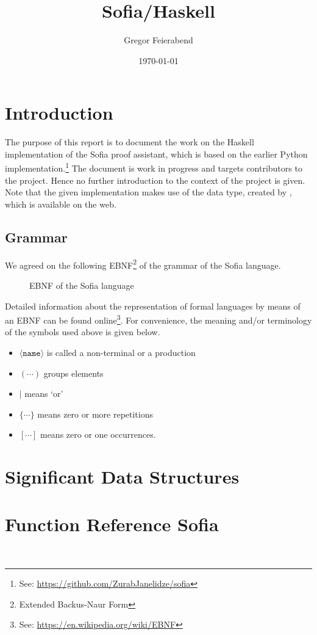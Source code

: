 \documentclass[notitlepage]{report}
\title{Sofia/Haskell}
\author{Gregor Feierabend}
\date{\today}
\begin{document}

\maketitle

\begingroup
\let\clearpage\relax
\tableofcontents
\endgroup


\chapter{Introduction}
The purpose of this report is to document the work on the Haskell
implementation of the Sofia proof assistant, which is based on the earlier
Python implementation.\footnote{See: %
\url{https://github.com/ZurabJanelidze/sofia}}
The document is work in progress and targets contributors to the project. Hence
no further introduction to the context of the project is given. Note that the
given implementation makes use of the  data type, created by
\textcite{Hutton}, which is available on the web.
\section{Grammar}
We agreed on the following EBNF\footnote{Extended Backus-Naur Form} of the
grammar of the Sofia language.
\begin{figure}[h!]
    {\renewcommand{\arraystretch}{2.0}
    }
    \caption{EBNF of the Sofia language}
\end{figure}

Detailed information about the representation of formal languages by means of an
EBNF can be found online\footnote{%
See: \url{https://en.wikipedia.org/wiki/EBNF}}. For convenience,
the meaning and/or terminology of the symbols used above is given below.
\begin{multicols}{2}
\begin{itemize}
    \item $\langle\texttt{name}\rangle$ is called a non-terminal or a production
    \item $(\cdots)$ groups elements
    \item $|$ means `or'
    \item $\{\cdots\}$ means zero or more repetitions
    \item $[\cdots]$ means zero or one occurrences.
\end{itemize}
\end{multicols}

\chapter{Significant Data Structures}
\vspace{-1cm}


\chapter{Function Reference Sofia}


\pagebreak
\begingroup
{}
\setlength\bibitemsep{10pt}
\printbibliography\
\endgroup
\end{document}
